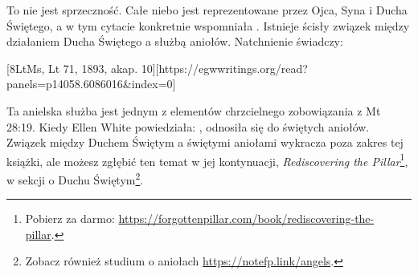To nie jest sprzeczność. Całe niebo jest reprezentowane przez Ojca, Syna i Ducha Świętego, a w tym cytacie konkretnie wspomniała . Istnieje ścisły związek między działaniem Ducha Świętego a służbą aniołów. Natchnienie świadczy:

[8LtMs, Lt 71, 1893, akap. 10][https://egwwritings.org/read?panels=p14058.6086016&index=0]

Ta anielska służba jest jednym z elementów chrzcielnego zobowiązania z Mt 28:19. Kiedy Ellen White powiedziała: , odnosiła się do świętych aniołów. Związek między Duchem Świętym a świętymi aniołami wykracza poza zakres tej książki, ale możesz zgłębić ten temat w jej kontynuacji, \textit{Rediscovering the Pillar}\footnote{Pobierz za darmo: \href{https://forgottenpillar.com/book/rediscovering-the-pillar}{https://forgottenpillar.com/book/rediscovering-the-pillar}.}, w sekcji o Duchu Świętym\footnote{Zobacz również studium o aniołach \href{https://notefp.link/angels}{https://notefp.link/angels}.}.


